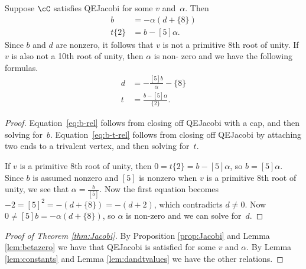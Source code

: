 \documentclass[12pt]{amsart}
\begin{document}
\begin{lemma} \label{lem:dandtvalues}
Suppose $\cC$ satisfies QEJacobi for some $v$ and~$\alpha$. Then 
\begin{align}
  [5] b &= - \alpha (d+\{8\})\label{eq:b-rel} \\
  t \{2\} &= b-[5] \alpha.\label{eq:b-t-rel}
\end{align}
Since $b$ and $d$ are nonzero, it follows that $v$ is not a primitive $8$th
root of unity.  If $v$ is also not a 10th root of unity, then $\alpha$ is non-
zero and we have the following formulas.
\begin{align*}
  d &= -\frac{[5] b}{\alpha} - \{8\}   \\
  t  &= \frac{b-[5] \alpha}{\{2\}}.
\end{align*}
\end{lemma}
\begin{proof}
Equation~\eqref{eq:b-rel} follows from closing off QEJacobi with a cap, and
then solving for~$b$. Equation~\eqref{eq:b-t-rel} follows from   closing off
QEJacobi by attaching two ends   to a trivalent vertex, and then solving
for~$t$.
  
If $v$ is a primitive $8$th root of unity, then $0 = t \{2\} = b-[5] \alpha$,
so $b = [5] \alpha$.  Since $b$ is assumed nonzero and $[5]$ is nonzero when
$v$ is a primitive $8$th root of unity, we see that $\alpha = \frac{b}{[5]}$.
Now the first equation becomes $-2 = [5]^2 = -(d+\{8\})=-(d+2)$, which
contradicts $d \neq 0$.   Now $0 \neq [5] b = - \alpha (d+\{8\})$, so $\alpha$
is non-zero and   we can solve for~$d$.
\end{proof}

\begin{proof}[Proof of Theorem \ref{thm:Jacobi}]
By Proposition \ref{prop:Jacobi} and Lemma \ref{lem:betazero} we have that
QEJacobi is satisfied for some $v$ and $\alpha$.  By Lemma \ref{lem:constants}
and Lemma \ref{lem:dandtvalues} we have the other relations.
\end{proof}
\end{document}

